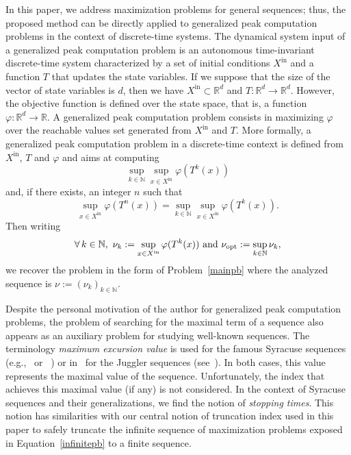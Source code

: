 \documentclass{article}
\def\rr{\mathbb R}
\def\rd{\rr^d}
\def\nn{\mathbb N}
\def\xin{X^\mathrm{in}}
\begin{document}
	
	In this paper, we address maximization problems for general sequences; thus, the proposed method can be directly applied to generalized peak computation problems in the context of discrete-time systems. The dynamical system input of a generalized peak computation problem is an autonomous time-invariant discrete-time system characterized by a set of initial conditions $\xin$ and a function $T$ that updates the state variables. If we suppose that the size of the vector of state variables is $d$, then we have $\xin\subset \rd$ and $T:\rd \to \rd$. However, the objective function is defined over the state space, that is, a function $\varphi:\rd \to \rr$. A generalized peak computation problem consists in maximizing $\varphi$ over the reachable values set generated from $\xin$ and $T$.
	More formally, a generalized peak computation problem in a discrete-time context is defined from $\xin$, $T$ and $\varphi$ and aims at computing
	\begin{equation}
		\label{infinitepb}
		\sup_{k\in\nn}\sup_{x\in\xin} \varphi(T^k(x))
	\end{equation}
	and, if there exists, an integer $n$ such that 
	\[
	\sup_{x\in\xin} \varphi(T^n(x))=\sup_{k\in\nn}\sup_{x\in\xin} \varphi(T^k(x)).
	\]
	Then writing 
	\begin{equation}
	\label{eq:nudef}
	\forall\,k\in\nn,\ \nu_k:=\sup_{x\in\xin} \varphi(T^k(x)) \text{ and } \nu_{\rm opt}:=\sup_{k\in\nn}\nu_k,
	\end{equation}
	we recover the problem in the form of Problem~\ref{mainpb} where the analyzed sequence is $\nu:=(\nu_k)_{k\in\nn}$.

Despite the personal motivation of the author for generalized peak computation problems, the problem of searching for the maximal term of a sequence also appears as an auxiliary problem for studying well-known sequences. The terminology \emph{maximum excursion value} is used for the famous Syracuse sequences (e.g.,~\cite[Part III]{lagarias2023ultimate} or ~\cite{silva1999maximum}) or in~\cite{prasadestimates} for the Juggler sequences (see~\cite{jugg}). In both cases, this value represents the maximal value of the sequence. Unfortunately, the index that achieves this maximal value (if any) is not considered. In the context of Syracuse sequences and their generalizations, we find the notion of \emph{stopping times}. This notion has similarities with our central notion of truncation index used in this paper to safely truncate the infinite sequence of maximization problems exposed in Equation~\eqref{infinitepb} to a finite sequence.   
	
\end{document}
